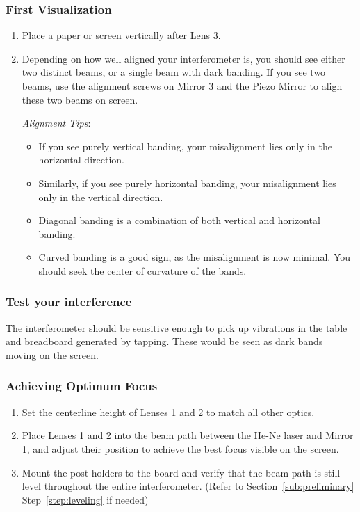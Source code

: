     \subsubsection{First Visualization}
        \begin{enumerate}
        \item Place a paper or screen vertically after Lens 3.
        \item Depending on how well aligned your interferometer is, you should
        see either two distinct beams, or a single beam with dark banding. If
        you see two beams, use the alignment screws on Mirror 3 and the Piezo
        Mirror to align these two beams on screen.

            \emph{Alignment Tips}:
            \begin{itemize}
            \item If you see purely vertical banding, your misalignment lies
            only in the horizontal direction.
            \item Similarly, if you see purely horizontal banding, your
            misalignment lies only in the vertical direction.
            \item Diagonal banding is a combination of both vertical and
            horizontal banding.
            \item Curved banding is a good sign, as the misalignment is now
            minimal.  You should seek the center of curvature of the bands.
            \end{itemize}
        \end{enumerate} 
    \subsubsection{Test your interference}

        The interferometer should be sensitive enough to pick up vibrations in
        the table and breadboard generated by tapping. These would be seen as
        dark bands moving on the screen.
    \subsubsection{Achieving Optimum Focus}
        \begin{enumerate}
        \item Set the centerline height of Lenses 1 and 2 to match all other
        optics.
        \item Place Lenses 1 and 2 into the beam path between the He-Ne laser
        and Mirror 1, and adjust their position to achieve the best focus
        visible on the screen.
        \item Mount the post holders to the board and verify that the beam path
        is still level throughout the entire interferometer. (Refer to Section~\ref{sub:preliminary} Step~\ref{step:leveling} if needed)
        \end{enumerate}


